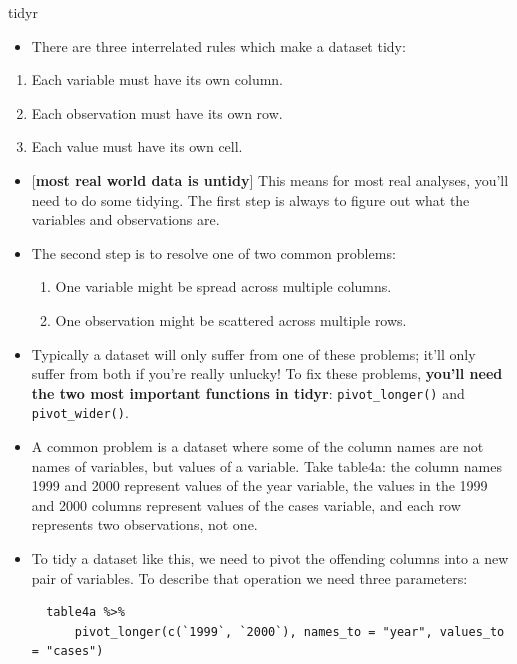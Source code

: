 \documentclass[ignorenonframetext,]{beamer}
\providecommand{\tightlist}{%
  \setlength{\itemsep}{0pt}\setlength{\parskip}{0pt}}
\begin{document}
\begin{frame}[fragile]{tidyr}
\protect\hypertarget{tidyr-3}{}

\begin{itemize}
\tightlist
\item
  There are three interrelated rules which make a dataset tidy:
\end{itemize}

\begin{enumerate}
\tightlist
\item
  Each variable must have its own column.
\item
  Each observation must have its own row.
\item
  Each value must have its own cell.
\end{enumerate}

\begin{itemize}
\item
  {[}\textbf{most real world data is untidy}{]} This means for most real
  analyses, you'll need to do some tidying. The first step is always to
  figure out what the variables and observations are.
\item
  The second step is to resolve one of two common problems:

  \begin{enumerate}
  \tightlist
  \item
    One variable might be spread across multiple columns.
  \item
    One observation might be scattered across multiple rows.
  \end{enumerate}
\item
  Typically a dataset will only suffer from one of these problems; it'll
  only suffer from both if you're really unlucky! To fix these problems,
  \textbf{you'll need the two most important functions in tidyr}:
  \texttt{pivot\_longer()} and \texttt{pivot\_wider()}.
\item
  A common problem is a dataset where some of the column names are not
  names of variables, but values of a variable. Take table4a: the column
  names 1999 and 2000 represent values of the year variable, the values
  in the 1999 and 2000 columns represent values of the cases variable,
  and each row represents two observations, not one.
\item
  To tidy a dataset like this, we need to pivot the offending columns
  into a new pair of variables. To describe that operation we need three
  parameters:

\begin{verbatim}
  table4a %>%
      pivot_longer(c(`1999`, `2000`), names_to = "year", values_to = "cases")
\end{verbatim}
\end{itemize}


\end{frame}
\end{document}
